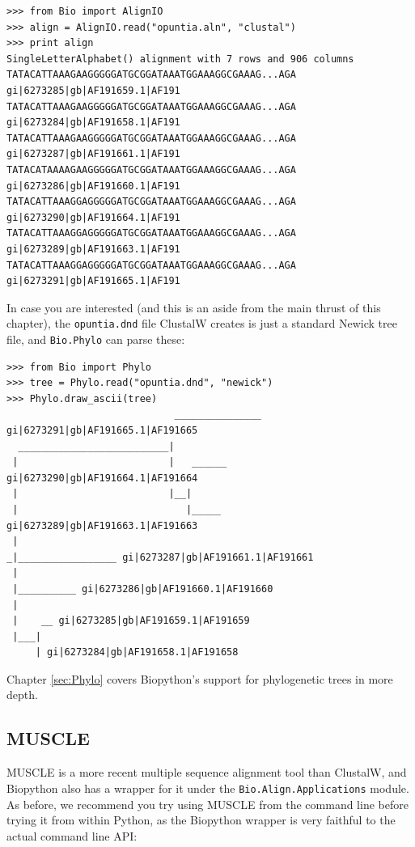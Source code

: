\documentclass{report}
\begin{document}
\begin{verbatim}
>>> from Bio import AlignIO
>>> align = AlignIO.read("opuntia.aln", "clustal")
>>> print align
SingleLetterAlphabet() alignment with 7 rows and 906 columns
TATACATTAAAGAAGGGGGATGCGGATAAATGGAAAGGCGAAAG...AGA gi|6273285|gb|AF191659.1|AF191
TATACATTAAAGAAGGGGGATGCGGATAAATGGAAAGGCGAAAG...AGA gi|6273284|gb|AF191658.1|AF191
TATACATTAAAGAAGGGGGATGCGGATAAATGGAAAGGCGAAAG...AGA gi|6273287|gb|AF191661.1|AF191
TATACATAAAAGAAGGGGGATGCGGATAAATGGAAAGGCGAAAG...AGA gi|6273286|gb|AF191660.1|AF191
TATACATTAAAGGAGGGGGATGCGGATAAATGGAAAGGCGAAAG...AGA gi|6273290|gb|AF191664.1|AF191
TATACATTAAAGGAGGGGGATGCGGATAAATGGAAAGGCGAAAG...AGA gi|6273289|gb|AF191663.1|AF191
TATACATTAAAGGAGGGGGATGCGGATAAATGGAAAGGCGAAAG...AGA gi|6273291|gb|AF191665.1|AF191
\end{verbatim}

In case you are interested (and this is an aside from the main thrust of this
chapter), the \texttt{opuntia.dnd} file ClustalW creates is just a standard
Newick tree file, and \verb|Bio.Phylo| can parse these:

\begin{verbatim}
>>> from Bio import Phylo
>>> tree = Phylo.read("opuntia.dnd", "newick")
>>> Phylo.draw_ascii(tree)
                             _______________ gi|6273291|gb|AF191665.1|AF191665
  __________________________|
 |                          |   ______ gi|6273290|gb|AF191664.1|AF191664
 |                          |__|
 |                             |_____ gi|6273289|gb|AF191663.1|AF191663
 |
_|_________________ gi|6273287|gb|AF191661.1|AF191661
 |
 |__________ gi|6273286|gb|AF191660.1|AF191660
 |
 |    __ gi|6273285|gb|AF191659.1|AF191659
 |___|
     | gi|6273284|gb|AF191658.1|AF191658

\end{verbatim}

\noindent Chapter \ref{sec:Phylo} covers Biopython's support for phylogenetic trees in more
depth.

\subsection{MUSCLE}
MUSCLE is a more recent multiple sequence alignment tool than ClustalW, and
Biopython also has a wrapper for it under the \verb|Bio.Align.Applications|
module. As before, we recommend you try using MUSCLE from the command line before
trying it from within Python, as the Biopython wrapper is very faithful to the
actual command line API:
\end{document}
